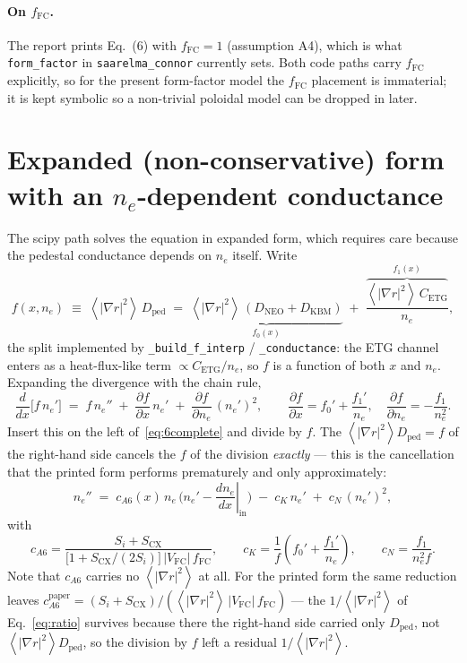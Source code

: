 \documentclass[11pt]{article}
\renewcommand{\ne}{n_{e}}  %
\newcommand{\Vfc}{\lvert V_{\mathrm{FC}}\rvert}
\newcommand{\Si}{S_{i}}
\newcommand{\Scx}{S_{\mathrm{CX}}}
\newcommand{\Dped}{D_{\mathrm{ped}}}
\newcommand{\fFC}{f_{\mathrm{FC}}}
\newcommand{\fsa}[1]{\left\langle #1 \right\rangle}
\newcommand{\gradrsq}{\fsa{|\nabla r|^{2}}}
\newcommand{\dnein}{\left.\frac{d\ne}{dx}\right|_{\mathrm{in}}}
\begin{document}
\paragraph{On $\fFC$.}  The report prints Eq.~(6) with $\fFC=1$
(assumption A4), which is what \texttt{form\_factor} in
\texttt{saarelma\_connor} currently sets.  Both code paths carry $\fFC$ explicitly, so for the
present form-factor model the $\fFC$ placement is immaterial; it is kept
symbolic so a non-trivial poloidal model can be dropped in later.

\section{Expanded (non-conservative) form with an $\ne$-dependent conductance}
\label{sec:expanded}

The scipy path solves the equation in expanded form, which requires care
because the pedestal conductance depends on $\ne$ itself.  Write
\begin{equation}
  f(x,\ne) \;\equiv\; \gradrsq\,\Dped
    \;=\; \underbrace{\gradrsq\,(D_{\mathrm{NEO}}+D_{\mathrm{KBM}})}_{\textstyle f_{0}(x)}
      \;+\; \frac{\overbrace{\gradrsq\,C_{\mathrm{ETG}}}^{\textstyle f_{1}(x)}}{\ne},
  \label{eq:fsplit}
\end{equation}
the split implemented by \texttt{\_build\_f\_interp} /
\texttt{\_conductance}: the ETG channel enters as a heat-flux-like term
$\propto C_{\mathrm{ETG}}/\ne$, so $f$ is a function of both $x$ and $\ne$.
Expanding the divergence with the chain rule,
\begin{equation}
  \frac{d}{dx}\bigl[f\,\ne'\bigr]
    \;=\; f\,\ne'' \;+\; \frac{\partial f}{\partial x}\,\ne'
      \;+\; \frac{\partial f}{\partial \ne}\,(\ne')^{2},
  \qquad
  \frac{\partial f}{\partial x} = f_{0}' + \frac{f_{1}'}{\ne},
  \quad
  \frac{\partial f}{\partial \ne} = -\frac{f_{1}}{\ne^{2}}.
\end{equation}
Insert this on the left of~\eqref{eq:6complete} and divide by $f$.  The
$\gradrsq\Dped = f$ of the right-hand side cancels the $f$ of the division
\emph{exactly} --- this is the cancellation that the printed form performs
prematurely and only approximately:
\begin{equation}
  \boxed{\;
  \ne'' \;=\; c_{A6}(x)\,\ne\,\bigl(\ne' - \dnein\bigr)
          \;-\; c_{K}\,\ne' \;+\; c_{N}\,(\ne')^{2},
  \;}
  \label{eq:phys-ode}
\end{equation}
with
\begin{equation}
  c_{A6} = \frac{\Si+\Scx}{\bigl[1+\Scx/(2\Si)\bigr]\,\Vfc\,\fFC},
  \qquad
  c_{K} = \frac{1}{f}\left(f_{0}' + \frac{f_{1}'}{\ne}\right),
  \qquad
  c_{N} = \frac{f_{1}}{\ne^{2} f}.
\end{equation}
Note that $c_{A6}$ carries no $\gradrsq$ at all.  For the printed form the
same reduction leaves
$c_{A6}^{\text{paper}} = (\Si+\Scx)/(\gradrsq\,\Vfc\,\fFC)$ --- the
$1/\gradrsq$ of Eq.~\eqref{eq:ratio} survives because there the right-hand
side carried only $\Dped$, not $\gradrsq\Dped$, so the division by $f$ left
a residual $1/\gradrsq$.
\end{document}
